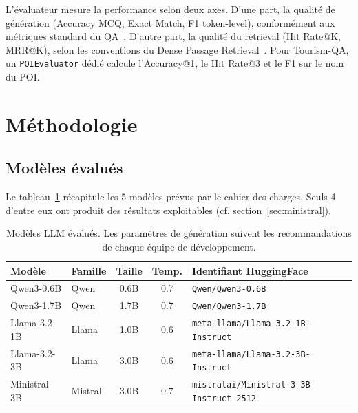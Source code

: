 \documentclass[12pt,a4paper]{article}
\begin{document}
L'\'evaluateur mesure la performance selon deux axes. D'une part, la qualit\'e de g\'en\'eration (Accuracy MCQ, Exact Match, F1 token-level), conform\'ement aux m\'etriques standard du QA~\cite{rajpurkar2016squad}. D'autre part, la qualit\'e du retrieval (Hit Rate@K, MRR@K), selon les conventions du Dense Passage Retrieval~\cite{karpukhin2020dense}. Pour Tourism-QA, un \texttt{POIEvaluator} d\'edi\'e calcule l'Accuracy@1, le Hit Rate@3 et le F1 sur le nom du POI.


\section{M\'ethodologie}
\label{sec:methodologie}

\subsection{Mod\`eles \'evalu\'es}

Le tableau~\ref{tab:modeles} r\'ecapitule les 5 mod\`eles pr\'evus par le cahier des charges. Seuls 4 d'entre eux ont produit des r\'esultats exploitables (cf. section~\ref{sec:ministral}).

\begin{table}[H]
\centering
\caption{Mod\`eles LLM \'evalu\'es. Les param\`etres de g\'en\'eration suivent les recommandations de chaque \'equipe de d\'eveloppement.}
\label{tab:modeles}
\small
\begin{tabular}{@{} l l c c l @{}}
\toprule
\textbf{Mod\`ele} & \textbf{Famille} & \textbf{Taille} & \textbf{Temp.}
  & \textbf{Identifiant HuggingFace} \\
\midrule
Qwen3-0.6B   & Qwen    & 0.6B & 0.7 & \texttt{Qwen/Qwen3-0.6B} \\
\rowcolor{lightgray}
Qwen3-1.7B   & Qwen    & 1.7B & 0.7 & \texttt{Qwen/Qwen3-1.7B} \\
Llama-3.2-1B & Llama   & 1.0B & 0.6 & \texttt{meta-llama/Llama-3.2-1B-Instruct} \\
\rowcolor{lightgray}
Llama-3.2-3B & Llama   & 3.0B & 0.6 & \texttt{meta-llama/Llama-3.2-3B-Instruct} \\
Ministral-3B & Mistral & 3.0B & 0.7 & \texttt{mistralai/Ministral-3-3B-Instruct-2512} \\
\bottomrule
\end{tabular}
\end{table}
\end{document}

